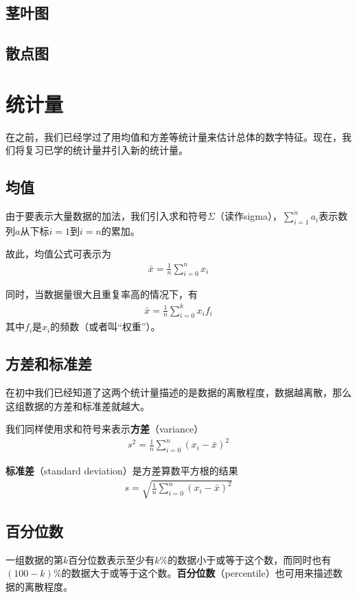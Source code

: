 \subsection{茎叶图}
\subsection{散点图}

\section{统计量}
在之前，我们已经学过了用均值和方差等统计量来估计总体的数字特征。现在，我们将复习已学的统计量并引入新的统计量。

\subsection{均值}
由于要表示大量数据的加法，我们引入求和符号$\Sigma$（读作sigma），${\displaystyle\sum_{i=1}^n a_i}$表示数列$a$从下标$i=1$到$i=n$的累加。

故此，均值公式可表示为
\begin{gather}
	\bar{x}=\frac{1}{n}\sum_{i=0}^n x_i \label{equ:mean-1}
\end{gather}

同时，当数据量很大且重复率高的情况下，有
\begin{gather}
	\bar{x}=\frac{1}{n}\sum_{i=0}^k x_if_i \label{equ:mean-2}
\end{gather}
其中$f_i$是$x_i$的频数（或者叫“权重”）。

\subsection{方差和标准差}
在初中我们已经知道了这两个统计量描述的是数据的离散程度，数据越离散，那么这组数据的方差和标准差就越大。

我们同样使用求和符号来表示\textbf{方差}（variance）
\begin{gather}
	s^2=\frac{1}{n}\sum_{i=0}^{n} (x_i-\bar{x})^2 \label{equ:variance}
\end{gather}

\textbf{标准差}（standard deviation）是方差算数平方根的结果
\begin{gather}
	s=\sqrt{\frac{1}{n}\sum_{i=0}^{n} (x_i-\bar{x})^2} \label{equ:standard-deviation}
\end{gather}

\subsection{百分位数}
一组数据的第$k$百分位数表示至少有$k\%$的数据小于或等于这个数，而同时也有$(100-k)\%$的数据大于或等于这个数。\textbf{百分位数}（percentile）也可用来描述数据的离散程度。


